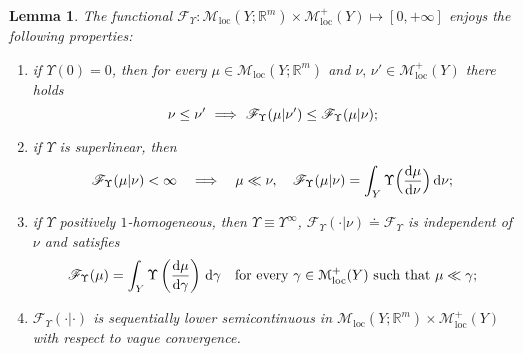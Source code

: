 \documentclass[11pt,reqno]{amsart}
\numberwithin{equation}{section}
\newcommand{\R}{\mathbb{R}}
\newcommand{\calF}{\mathcal{F}}
\newcommand{\dd}{\mathrm{d}}
\newtheorem{lemma}[theorem]{Lemma}
\theoremstyle{definition}
\def\dd{\mathrm{d}}
\newcommand{\pinfty}{{+\infty}}
\def\calF{\mathscr F}
\newcommand{\Mloc}{\mathcal{M}_{\mathrm{loc}}}
\newcommand{\RNEW}{\color{black}} %
\newcommand{\TODO}[1]{\todo[inline, color=cyan!20]{#1}}
\newcommand{\EEE}{\color{black}}
\numberwithin{equation}{section}
\begin{document}
\begin{lemma}
\label{l:crucial-F}
The functional $\calF_\Upsilon:\Mloc(Y;\R^m) \times \Mloc^+(Y)\mapsto [0,\pinfty]$ enjoys the following properties:
\begin{enumerate}
\item \RNEW if $\Upsilon(0)=0$, then for every $\mu \in \Mloc(Y;\R^m) $ and $\nu,\, \nu' \in \Mloc^+(Y)$ there holds
\begin{equation}
\label{AC-monotonicity}
\nu \leq \nu' \ \Longrightarrow  \ \calF_\Upsilon(\mu|\nu') \leq  \calF_\Upsilon(\mu|\nu); \EEE 
\end{equation} \EEE
 \item if $\Upsilon$ is superlinear, then
\begin{equation}
\label{superlinearity}
  \calF_\Upsilon(\mu|\nu)<\infty\quad\Longrightarrow\quad
  \mu\ll\nu,\quad
  \calF_\Upsilon(\mu|\nu)=
\int_Y \Upsilon \Bigl(\frac{\dd \mu}{\dd \nu}\Bigr)\,\dd\nu;
\end{equation}
\item if $ \Upsilon$  positively $1$-homogeneous, then
    $\Upsilon\equiv \Upsilon^\infty$, $\calF_\Upsilon(\cdot|\nu)  \doteq \calF_\Upsilon$ is
    independent of $\nu$ and  satisfies
    \begin{equation}
      \label{eq:78}
       \calF_\Upsilon(\mu) \EEE =\int_Y
      \Upsilon\left(\frac{\dd\mu}{\dd\gamma}\right)
      \,\dd\gamma\quad
      \text{for every }\gamma\in \Mloc^+(Y)\text{ such that } \mu\ll\gamma;
    \end{equation}
    \item  $\calF_\Upsilon(\cdot|\cdot)$ is  sequentially  lower
    semicontinuous in $\Mloc(Y;\R^m) \times \Mloc^+(Y)$ with respect
    to vague convergence.
\end{enumerate}
\end{lemma}


%
\end{document}
